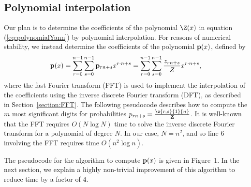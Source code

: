 \subsection{Polynomial interpolation}
Our plan is to determine the coefficients of the polynomial
$\Z(x)$ in equation (\ref{eq:polynomialYann}) by
polynomial interpolation.  For reasons of numerical stability,
we instead determine the coefficients of the polynomial ${\bf p}(x)$,
defined by
\begin{eqnarray}
\label{eq:polynomialYannP}
{\bf p}(x) =
\sum_{r=0}^{n-1} \sum_{s=0}^{n-1}  {\bf p}_{rn+s}
 x^{r\cdot n + s} =
\sum_{r=0}^{n-1} \sum_{s=0}^{n-1}  \frac{z_{rn+s}}{Z}
 x^{r\cdot n + s},
\end{eqnarray}
where the fast Fourier transform (FFT) is used to implement the
interpolation of
the coefficients using the inverse discrete Fourier transform (DFT), as
described in Section~\ref{section:FFT}.  The following pseudocode describes how
to compute the $m$ most significant digits
for probabilities
$p_{rn+s} = \frac{\z{r,s}{1}{n}}{{\bf Z}}$. It is well-known that
the FFT requires $O(N \log N)$ time to solve the inverse discrete
Fourier transform for a polynomial of degree $N$. In our case,
$N=n^2$, and so line 6 involving the FFT requires time $O(n^2 \log n)$.

The pseudocode for the algorithm to compute ${\bf p}(x)$ is given in
Figure~1.
In the next section, we explain a highly non-trivial improvement of
this algorithm to reduce time by a factor of $4$.

